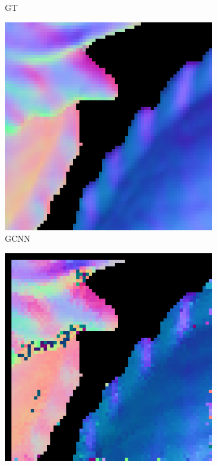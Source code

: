 \begin{figure}[th]
\begin{subfigure}[b]{0.15\linewidth}
		\caption{GT}
	\end{subfigure}
		\begin{subfigure}[b]{0.15\linewidth}
		\includegraphics[width=\linewidth]{./Figures/comparison/eval_2_normal_GCNN.png}
		\caption{GCNN}
	\end{subfigure}
		\begin{subfigure}[b]{0.15\linewidth}
		\includegraphics[width=\linewidth]{./Figures/comparison/eval_2_normal_SVD.png}

\end{subfigure}
\end{figure}
